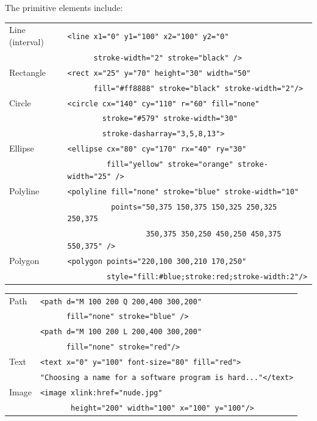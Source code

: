 \documentclass[a4paper]{article}
\begin{document}
The primitive elements include:
\begin{center}
\begin{tabular}{|l|l|}
        \hline
        \textsf{Line} (interval) & 
        \verb!<line x1="0" y1="100" x2="100" y2="0"! \\
         & \verb!      stroke-width="2" stroke="black" />! \\
        \hline
        \textsf{Rectangle} &
        \verb!<rect x="25" y="70" height="30" width="50"! \\
        & \verb!      fill="#ff8888" stroke="black" stroke-width="2"/>! \\
        \hline
        \textsf{Circle} &
        \verb!<circle cx="140" cy="110" r="60" fill="none"!\\
         & \verb!        stroke="#579" stroke-width="30"! \\
        & \verb!        stroke-dasharray="3,5,8,13">! \\
        \hline
        \textsf{Ellipse} &
        \verb!<ellipse cx="80" cy="170" rx="40" ry="30"!\\
        & \verb!         fill="yellow" stroke="orange" stroke-width="25" />! \\
        \hline
        \textsf{Polyline}
        & \verb+<polyline fill="none" stroke="blue" stroke-width="10"+ \\
        & \verb!          points="50,375 150,375 150,325 250,325 250,375! \\
        & \verb!                  350,375 350,250 450,250 450,375 550,375" />!\\
        \hline
        \textsf{Polygon} & 
        \verb!<polygon points="220,100 300,210 170,250"! \\     
        & \verb!         style="fill:#blue;stroke:red;stroke-width:2"/>!\\
        \hline
\end{tabular}
\end{center}

\begin{center}
\begin{tabular}{|l|l|}
        \hline
        \textsf{Path} & 
        \verb!<path d="M 100 200 Q 200,400 300,200"! \\
        &\verb!      fill="none" stroke="blue" />! \\
        &\verb!<path d="M 100 200 L 200,400 300,200"! \\
        &\verb!      fill="none" stroke="red"/>! \\
        \hline
        \textsf{Text} & \verb!<text x="0" y="100" font-size="80" fill="red">! \\
        & \verb!"Choosing a name for a software program is hard..."</text>! \\
        \hline
        \textsf{Image} & \verb!<image xlink:href="nude.jpg"!\\
        & \verb!       height="200" width="100" x="100" y="100"/>! \\
        \hline
\end{tabular}
\end{center}
\end{document}
